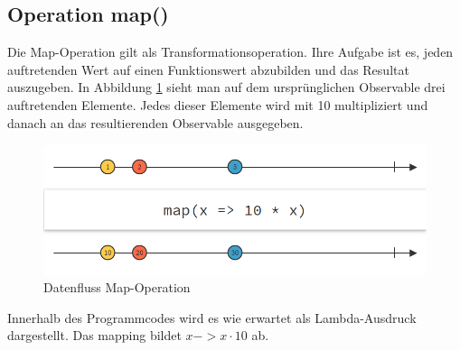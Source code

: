 \subsection{Operation map()}
Die Map-Operation gilt als Transformationsoperation. Ihre Aufgabe ist es, jeden auftretenden Wert auf einen Funktionswert abzubilden und das Resultat auszugeben. In Abbildung \ref{pic:map} sieht man auf dem ursprünglichen Observable drei auftretenden Elemente. Jedes dieser Elemente wird mit 10 multipliziert und danach an das resultierenden Observable ausgegeben. 
\begin{figure}[hbt]
	\centering
	\includegraphics[width=1\textwidth]{Abb/map}
	\caption{Datenfluss Map-Operation}
	\label{pic:map}
\end{figure}
 
Innerhalb des Programmcodes wird es wie erwartet als Lambda-Ausdruck dargestellt. Das mapping bildet $x -> x \cdot 10$ ab.
